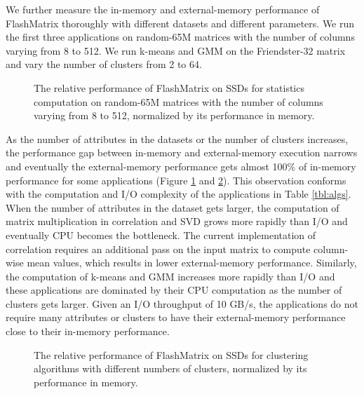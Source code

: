 We further measure the in-memory and external-memory performance of FlashMatrix
thoroughly with different datasets and different parameters. We run the first
three applications on random-65M matrices
with the number of columns varying from 8 to 512. We run k-means
and GMM on the Friendster-32 matrix and vary the number of clusters from 2 to 64.

\begin{figure}
	\begin{center}
		\footnotesize
		\vspace{-15pt}
		
		\vspace{-10pt}
		\caption{The relative performance of FlashMatrix on SSDs for
			statistics computation on random-65M matrices with the number of
			columns varying from 8 to 512, normalized by its performance
		in memory.}
		\label{perf:stat}
	\end{center}
\end{figure}

As the number of attributes in the datasets or the number of clusters increases,
the performance gap between in-memory and external-memory execution
narrows and eventually the external-memory performance gets almost 100\%
of in-memory performance for some applications (Figure \ref{perf:stat} and
\ref{perf:clust}).
This observation conforms with the computation and I/O complexity of
the applications in Table \ref{tbl:algs}. When the number of attributes
in the dataset gets larger, the computation of matrix multiplication in
correlation and SVD grows more rapidly than I/O and eventually CPU becomes
the bottleneck. The current implementation of correlation requires an additional
pass on the input matrix to compute column-wise mean values, which results in
lower external-memory performance. Similarly,
the computation of k-means and GMM increases more rapidly than I/O and
these applications are dominated by their CPU computation as the number
of clusters gets larger. Given an I/O throughput of 10 GB/s, the applications
do not require many attributes or clusters to have their external-memory
performance close to their in-memory performance.

\begin{figure}
	\begin{center}
		\footnotesize
		\vspace{-15pt}
		
		\vspace{-10pt}
		\caption{The relative performance of FlashMatrix on SSDs for
			clustering algorithms with different numbers of clusters, normalized
		by its performance in memory.}
		\label{perf:clust}
	\end{center}
\end{figure}

